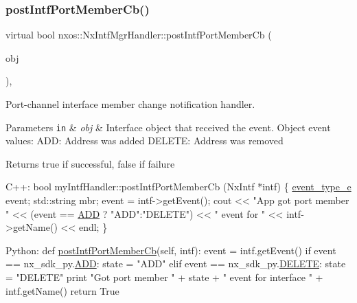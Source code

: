 \subsubsection{\texorpdfstring{post\+Intf\+Port\+Member\+Cb()}{postIntfPortMemberCb()}}
{\footnotesize\ttfamily virtual bool nxos\+::\+Nx\+Intf\+Mgr\+Handler\+::post\+Intf\+Port\+Member\+Cb (\begin{DoxyParamCaption}\item[{\mbox{\hyperlink{classnxos_1_1_nx_intf}{Nx\+Intf}} $\ast$}]{obj }\end{DoxyParamCaption})\hspace{0.3cm}{\ttfamily [inline]}, {\ttfamily [virtual]}}

Port-\/channel interface member change notification handler. 
\begin{DoxyParams}[1]{Parameters}
\mbox{\tt in}  & {\em obj} & Interface object that received the event. Object event values\+: A\+DD\+: Address was added D\+E\+L\+E\+TE\+: Address was removed \\
\hline
\end{DoxyParams}
\begin{DoxyReturn}{Returns}
true if successful, false if failure
\end{DoxyReturn}

\begin{DoxyCode}
C++:
   \textcolor{keywordtype}{bool} myIntfHandler::postIntfPortMemberCb (NxIntf *intf)
   \{
      \mbox{\hyperlink{namespacenxos_af9a9040b7681199d386e94eb888018cb}{event\_type\_e}}  event;
      std::string mbr;
      \textcolor{keyword}{event} = intf->getEvent();
      cout << \textcolor{stringliteral}{"App got port member "} << (\textcolor{keyword}{event} == \mbox{\hyperlink{namespacenxos_af9a9040b7681199d386e94eb888018cba93d8c810253e44a0fd5f3d8d26032ad5}{ADD}} ? 
     \textcolor{stringliteral}{"ADD"}:\textcolor{stringliteral}{"DELETE"}) << \textcolor{stringliteral}{" event for "} << intf->getName() << endl;
   \}

Python:   
   def \mbox{\hyperlink{classnxos_1_1_nx_intf_mgr_handler_ae3a76ba4fb97b941d9f11e9210d89a94}{postIntfPortMemberCb}}(\textcolor{keyword}{self}, intf):
      event = intf.getEvent()
      if event == nx\_sdk\_py.\mbox{\hyperlink{namespacenxos_af9a9040b7681199d386e94eb888018cba93d8c810253e44a0fd5f3d8d26032ad5}{ADD}}:
         state = \textcolor{stringliteral}{"ADD"}
      elif event == nx\_sdk\_py.\mbox{\hyperlink{namespacenxos_af9a9040b7681199d386e94eb888018cba7ec7c9f77651a43ea2562bb5bcb6a3a9}{DELETE}}:
         state = \textcolor{stringliteral}{"DELETE"}
      print \textcolor{stringliteral}{"Got port member "} + state + 
          \textcolor{stringliteral}{" event for interface "} + intf.getName()
      return True
\end{DoxyCode}



